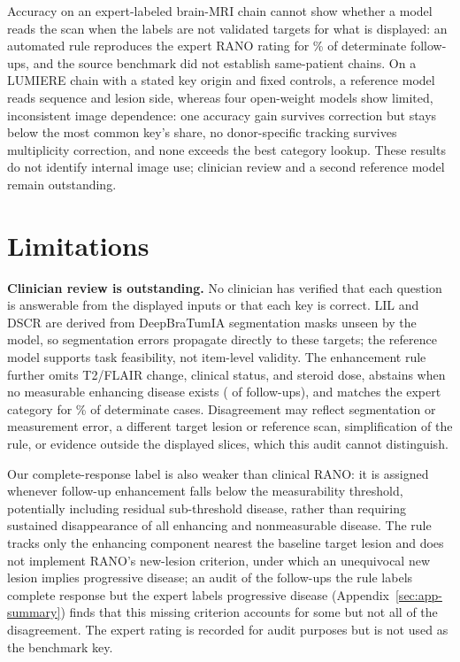 \documentclass[11pt]{article}
\begin{document}
Accuracy on an expert-labeled brain-MRI chain cannot show whether a model reads the scan when the labels are not validated targets for what is displayed: an automated rule reproduces the expert RANO rating for \vfourConcordantDetPct{}\% of determinate follow-ups, and the source benchmark did not establish same-patient chains. On a LUMIERE chain with a stated key origin and fixed controls, a reference model reads sequence and lesion side, whereas four open-weight models show limited, inconsistent image dependence: one accuracy gain survives correction but stays below the most common key's share, no donor-specific tracking survives multiplicity correction, and none exceeds the best category lookup. These results do not identify internal image use; clinician review and a second reference model remain outstanding.



\section*{Limitations}
\label{sec:limitations}

\textbf{Clinician review is outstanding.} No clinician has verified that each question is answerable from the displayed inputs or that each key is correct. LIL and DSCR are derived from DeepBraTumIA segmentation masks unseen by the model, so segmentation errors propagate directly to these targets; the reference model supports task feasibility, not item-level validity. The enhancement rule further omits T2/FLAIR change, clinical status, and steroid dose, abstains when no measurable enhancing disease exists (\vfourUndetermined{} of \vfourFollowups{} follow-ups), and matches the expert category for \vfourConcordantDetPct{}\% of determinate cases. Disagreement may reflect segmentation or measurement error, a different target lesion or reference scan, simplification of the rule, or evidence outside the displayed slices, which this audit cannot distinguish.

Our complete-response label is also weaker than clinical RANO: it is assigned whenever follow-up enhancement falls below the measurability threshold, potentially including residual sub-threshold disease, rather than requiring sustained disappearance of all enhancing and nonmeasurable disease. The rule tracks only the enhancing component nearest the baseline target lesion and does not implement RANO's new-lesion criterion, under which an unequivocal new lesion implies progressive disease; an audit of the follow-ups the rule labels complete response but the expert labels progressive disease (Appendix~\ref{sec:app-summary}) finds that this missing criterion accounts for some but not all of the disagreement. The expert rating is recorded for audit purposes but is not used as the benchmark key.
\end{document}
